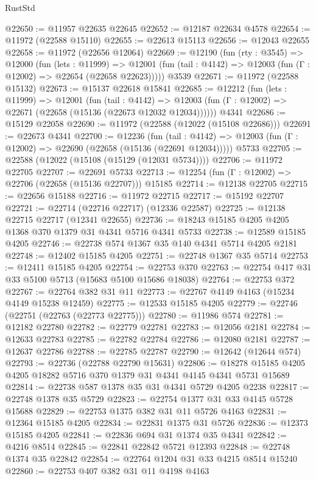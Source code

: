 \begin{lexlean}{RustStd}
\begin{coremodule}
@22650 := @11957 @22635 @22645
@22652 := @12187 @22634 @4578
@22654 := @11972 (@22588 @15110)
@22655 := @22613 @15113
@22656 := @12043 @22655
@22658 := @11972 (@22656 @12064)
@22669 := @12190
    (fun (rty : @3545) =>
    @12000
      (fun (lets : @11999) =>
      @12001 (fun (tail : @4142) => @12003 (fun (Γ : @12002) => @22654 (@22658 @22623)))))
    @3539
@22671 := @11972 (@22588 @15132)
@22673 := @15137 @22618 @15841
@22685 := @12212
    (fun (lets : @11999) =>
    @12001
      (fun (tail : @4142) =>
      @12003 (fun (Γ : @12002) => @22671 (@22658 (@15136 (@22673 @12032 @12034))))))
    @4341
@22686 := @15129 @22058
@22690 := @11972 (@22588 (@12022 (@15108 @22686)))
@22691 := @22673 @4341
@22700 := @12236
    (fun (tail : @4142) => @12003 (fun (Γ : @12002) => @22690 (@22658 (@15136 (@22691 @12034)))))
    @5733
@22705 := @22588 (@12022 (@15108 (@15129 (@12031 @5734))))
@22706 := @11972 @22705
@22707 := @22691 @5733
@22713 := @12254 (fun (Γ : @12002) => @22706 (@22658 (@15136 @22707))) @15185
@22714 := @12138 @22705
@22715 := @22656 @15188
@22716 := @11972 @22715
@22717 := @15192 @22707
@22721 := @22714 (@22716 @22717) (@12336 @22587)
@22725 := @12138 @22715 @22717 (@12341 @22655)
@22736 := @18243 @15185 @4205 @4205 @1368 @370 @1379 @31 @4341 @5716 @4341 @5733
@22738 := @12589 @15185 @4205
@22746 := @22738 @574 @1367 @35 @140 @4341 @5714 @4205 @2181
@22748 := @12402 @15185 @4205
@22751 := @22748 @1367 @35 @5714
@22753 := @12411 @15185 @4205
@22754 := @22753 @370
@22763 := @22754 @417 @31 @33 @5100 @5713 (@15683 @5100 @15686 @18038)
@22764 := @22753 @372
@22767 := @22764 @382 @31 @11
@22773 := @22767 @4149 @4163 (@15234 @4149 @15238 @12459)
@22775 := @12533 @15185 @4205
@22779 := @22746 (@22751 (@22763 (@22773 @22775)))
@22780 := @11986 @574
@22781 := @12182 @22780
@22782 := @22779 @22781
@22783 := @12056 @2181
@22784 := @12633 @22783
@22785 := @22782 @22784
@22786 := @12080 @2181
@22787 := @12637 @22786
@22788 := @22785 @22787
@22790 := @12642 (@12644 @574)
@22793 := @22736 (@22788 @22790 @15631)
@22806 := @18278 @15185 @4205 @4205 @18282 @5716 @370 @1379 @31 @4341 @4145 @4341 @5731 @15689
@22814 := @22738 @587 @1378 @35 @31 @4341 @5729 @4205 @2238
@22817 := @22748 @1378 @35 @5729
@22823 := @22754 @1377 @31 @33 @4145 @5728 @15688
@22829 := @22753 @1375 @382 @31 @11 @5726 @4163
@22831 := @12364 @15185 @4205
@22834 := @22831 @1375 @31 @5726
@22836 := @12373 @15185 @4205
@22841 := @22836 @694 @31 @1374 @35 @4341
@22842 := @4216 @8514
@22845 := @22841 @22842 @5721 @12393
@22848 := @22748 @1374 @35 @22842
@22854 := @22764 @1204 @31 @33 @4215 @8514 @15240
@22860 := @22753 @407 @382 @31 @11 @4198 @4163

\end{coremodule}
\end{lexlean}
